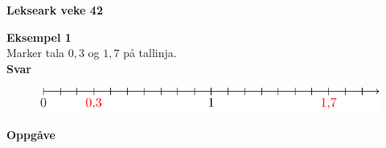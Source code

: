 
\usepackage[T1]{fontenc}
\usepackage[utf8]{luainputenc}
\usepackage{lmodern} %
\usepackage{geometry}
\geometry{verbose,a4paper, inner=2.3cm, outer=1.8 cm, bmargin=1cm, tmargin=1cm}
\setlength{\parindent}{0bp}
\usepackage{import}
\usepackage[subpreambles=false]{standalone}
\usepackage{amsmath}
\usepackage{amssymb}
\usepackage{esint}
\usepackage{icomma}
\usepackage{babel}
\usepackage{tabu}
\usepackage[many]{tcolorbox}





\pagestyle{empty}

{\huge \textbf{Lekseark veke 42}} \\[5pt]

\begin{tcolorbox}[boxrule=0.1 mm,arc=0mm,enhanced jigsaw,breakable,colback=white] {\footnotesize \textbf{Eksempel 1} \\} \footnotesize 
Marker tala $ 0,3 $ og $ 1,7 $ på tallinja.\\[12pt]
\textbf{Svar}
\begin{figure}
	\centering
	\includegraphics{tallineks}
\end{figure}
 \end{tcolorbox} \vspace{20pt}

\textbf{Oppgåve}

